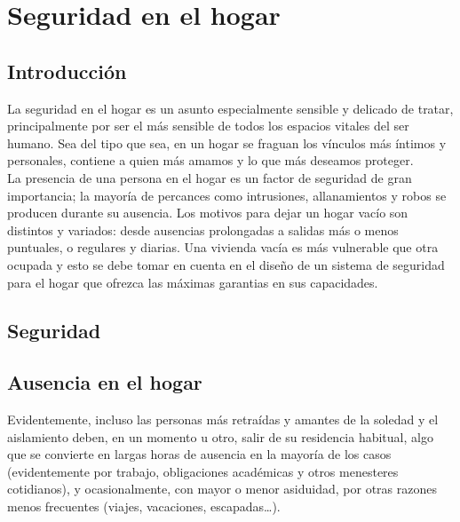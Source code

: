 \chapter{Seguridad en el hogar}



\section{Introducción}
La seguridad en el hogar es un asunto especialmente sensible y delicado de tratar, principalmente por ser el más sensible de todos los espacios vitales del ser humano. Sea del tipo que sea, en un hogar se fraguan los vínculos más íntimos y personales, contiene a quien más amamos y lo que más deseamos proteger.\\

La presencia de una persona en el hogar es un factor de seguridad de gran importancia; la mayoría de percances como intrusiones, allanamientos y robos se producen durante su ausencia. Los motivos para dejar un hogar vacío son distintos y variados: desde ausencias prolongadas a salidas más o menos puntuales, o regulares y diarias. Una vivienda vacía es más vulnerable que otra ocupada y esto se debe tomar en cuenta en el diseño de un sistema de seguridad para el hogar que ofrezca las máximas garantias en sus capacidades.\\

\section{Seguridad}

\section{Ausencia en el hogar}
Evidentemente, incluso las personas más retraídas y amantes de la soledad y el aislamiento deben, en un momento u otro, salir de su residencia habitual, algo que se convierte en largas horas de ausencia en la mayoría de los casos (evidentemente por trabajo, obligaciones académicas y otros menesteres cotidianos), y ocasionalmente, con mayor o menor asiduidad, por otras razones menos frecuentes (viajes, vacaciones, escapadas…).\\

